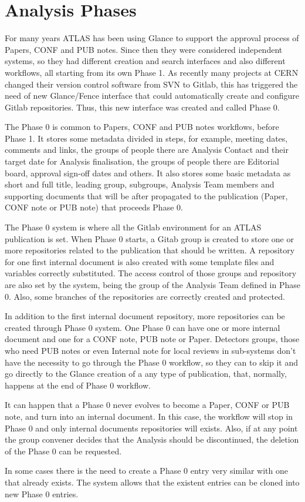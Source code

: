 \section{Analysis Phases}
\label{sec:analysis-phases}

For many years ATLAS has been using Glance to support the approval process of Papers, CONF and PUB notes. Since then they were considered independent systems, so they had different creation and search interfaces and also different workflows, all starting from its own Phase 1. As recently many projects at CERN changed their version control software from SVN to Gitlab, this has triggered the need of new Glance/Fence interface that could automatically create and configure Gitlab repositories. Thus, this new interface was created and called Phase 0.

The Phase 0 is common to Papers, CONF and PUB notes workflows, before Phase 1. It stores some metadata divided in steps, for example, meeting dates, comments and links, the groups of people there are Analysis Contact and their target date for Analysis finalisation, the groups of people there are Editorial board, approval sign-off dates and others. It also stores some basic metadata as short and full title, leading group, subgroups, Analysis Team members and supporting documents that will be after propagated to the publication (Paper, CONF note or PUB note) that proceeds Phase 0.

The Phase 0 system is where all the Gitlab environment for an ATLAS publication is set. When Phase 0 starts, a Gitab group is created to store one or more repositories related to the publication that should be written. A repository for one first internal document is also created with some template files and variables correctly substituted. The access control of those groups and repository are also set by the system, being the group of the Analysis Team defined in Phase 0. Also, some branches of the repositories are correctly created and protected.

In addition to the first internal document repository, more repositories can be created through Phase 0 system. One Phase 0 can have one or more internal document and one for a CONF note, PUB note or Paper. Detectors groups, those who need PUB notes or even Internal note for local reviews in sub-systems don’t have the necessity to go through the Phase 0 workflow, so they can to skip it and go directly to the Glance creation of a any type of publication, that, normally, happens at the end of Phase 0 workflow.

It can happen that a Phase 0 never evolves to become a Paper, CONF or PUB note, and turn into an internal document. In this case, the workflow will stop in Phase 0 and only internal documents repositories will exists. Also, if at any point the group convener decides that the Analysis should be discontinued, the deletion of the Phase 0 can be requested.

In some cases there is the need to create a Phase 0 entry very similar with one that already exists. The system allows that the existent entries can be cloned into new Phase 0 entries.